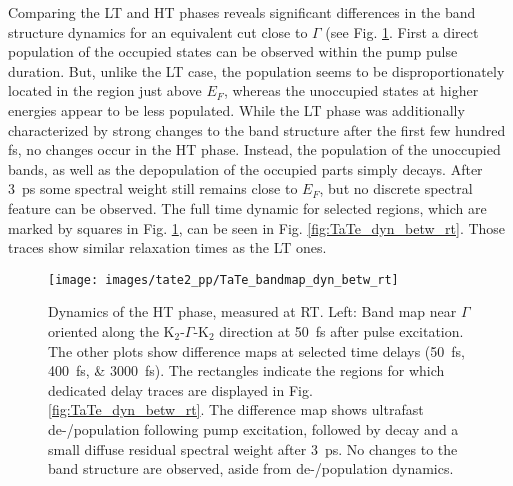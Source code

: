 Comparing the LT and HT phases reveals significant differences in the band structure dynamics for an equivalent cut close to $\Gamma$ (see Fig. \ref{fig:TaTe_bandmap_dyn_betw_rt}.
First a direct population of the occupied states can be observed within the pump pulse duration.
But, unlike the LT case, the population seems to be disproportionately located in the region just above $E_F$, whereas the unoccupied states at higher energies appear to be less populated.
While the LT phase was additionally characterized by strong changes to the band structure after the first few hundred \unit{\femto\second}, no changes occur in the HT phase.
Instead, the population of the unoccupied bands, as well as the depopulation of the occupied parts simply decays.
After \qty{3}{\pico\second} some spectral weight still remains close to $E_F$, but no discrete spectral feature can be observed.
The full time dynamic for selected regions, which are marked by squares in Fig. \ref{fig:TaTe_bandmap_dyn_betw_rt}, can be seen in Fig. \ref{fig:TaTe_dyn_betw_rt}.
Those traces show similar relaxation times as the LT ones.

\begin{figure}[t!]
	\centering
	\texttt{[image: images/tate2\_pp/TaTe\_bandmap\_dyn\_betw\_rt]}
	\caption{Dynamics of the HT phase, measured at RT. Left: Band map near $\Gamma$ oriented along the K$_2$-$\Gamma$-K$_2$ direction at \qty{50}{\femto\second} after pulse excitation. The other plots show difference maps at selected time delays (\qtylist{50;400;3000}{\femto\second}). The rectangles indicate the regions for which dedicated delay traces are displayed in Fig. \ref{fig:TaTe_dyn_betw_rt}. The difference map shows ultrafast de-/population following pump excitation, followed by decay and a small diffuse residual spectral weight after \qty{3}{\pico\second}. No changes to the band structure are observed, aside from de-/population dynamics.}
	\label{fig:TaTe_bandmap_dyn_betw_rt}
\end{figure}

